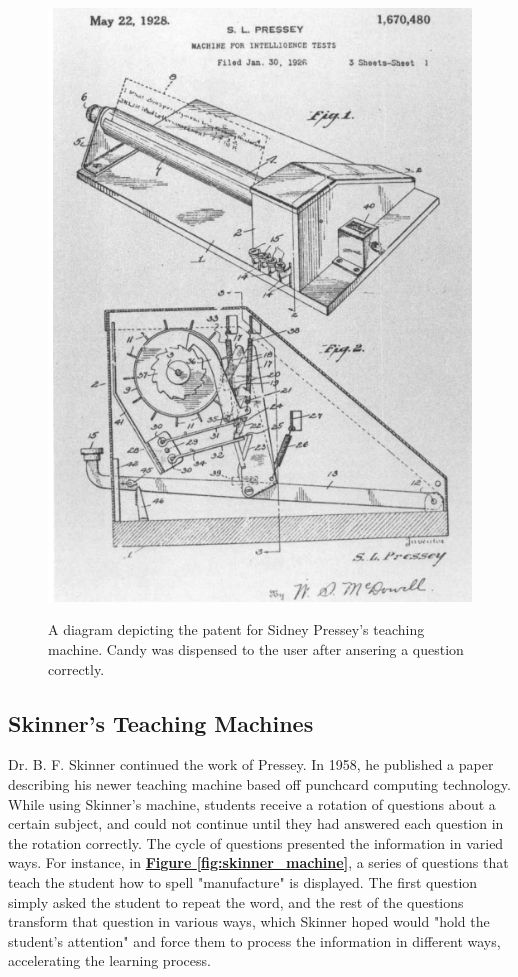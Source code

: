  \begin{figure}[h]
 	\includegraphics[width=1.0\linewidth]{figures/pressey_machine}
 	\caption{A diagram depicting the patent for Sidney Pressey's teaching machine. Candy was dispensed to the user after ansering a question correctly.}
 	\label{fig:pressey_machine}
 	\cite{benjamin1988history}
 \end{figure}
 
 \subsection{Skinner's Teaching Machines}
 \par Dr. B. F. Skinner continued the work of Pressey. In 1958, he published a paper describing his newer teaching machine based off punchcard computing technology. While using Skinner's machine, students receive a rotation of questions about a certain subject, and could not continue until they had answered each question in the rotation correctly. The cycle of questions presented the information in varied ways. For instance, in \textbf{\hyperref[fig:skinner_machine]{Figure \ref*{fig:skinner_machine}}}, a series of questions that teach the student how to spell "manufacture" is displayed. The first question simply asked the student to repeat the word, and the rest of the questions transform that question in various ways, which Skinner hoped would "hold the student's attention" and force them to process the information in different ways, accelerating the learning process. 
 
